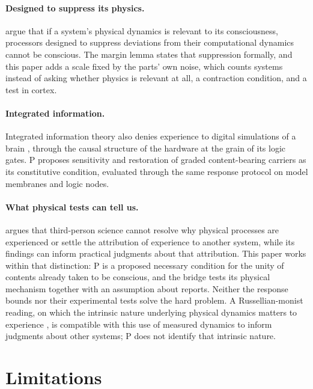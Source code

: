 \documentclass[12pt]{article}
\begin{document}
\paragraph{Designed to suppress its physics.} \citet{kleiner2024} argue that if a
system's physical dynamics is relevant to its consciousness, processors designed
to suppress deviations from their computational dynamics cannot be conscious.
The margin lemma states that suppression formally, and this paper adds a scale
fixed by the parts' own noise, which counts systems instead of asking whether
physics is relevant at all, a contraction condition, and a test in cortex.

\paragraph{Integrated information.} Integrated information theory also denies
experience to digital simulations of a brain \citep{tononi2015,findlay2024},
through the causal structure of the hardware at the grain of its logic gates.
P proposes sensitivity and restoration of graded content-bearing carriers as
its constitutive condition, evaluated through the same response protocol on
model membranes and logic nodes.

\paragraph{What physical tests can tell us.} \citet{love2026} argues that
third-person science cannot resolve why physical processes are experienced or
settle the attribution of experience to another system, while its findings can
inform practical judgments about that attribution. This paper works within
that distinction: P is a proposed necessary condition for the unity of contents
already taken to be conscious, and the bridge tests its physical mechanism
together with an assumption about reports. Neither the response bounds nor
their experimental tests solve the hard problem. A Russellian-monist reading,
on which the intrinsic nature underlying physical dynamics matters to
experience \citep{alterpereboom2023}, is compatible with this use of measured
dynamics to inform judgments about other systems; P does not identify that
intrinsic nature.

\section{Limitations}
\label{sec:limitations}
\end{document}
